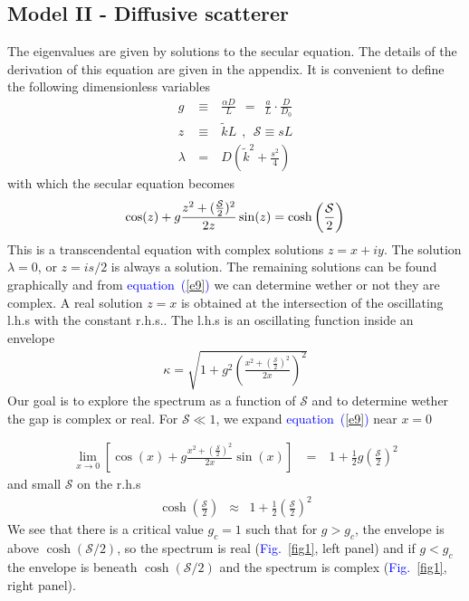\documentclass[aps,pre,floats,floatfix,fleqn,notitlepage]{revtex4-1}
\newcommand{\mylabel}[1]{\label{#1}}  %
\newcommand{\beq}{\begin{eqnarray}}
\newcommand{\eeq}{\end{eqnarray}}
\newcommand{\be}[1]{\begin{eqnarray}\ifthenelse{#1=-1}{\nonumber}{\ifthenelse{#1=0}{}{\mylabel{e#1}}}}
\newcommand{\ee}{\end{eqnarray}}
\newcommand{\Eq}[1]{\textcolor{blue}{equation~(\ref{#1})}} %
\newcommand{\Fig}[1] {\textcolor{blue}{Fig.~\ref{#1}}} %
\begin{document}
\subsection{Model II - Diffusive scatterer}
The eigenvalues are given by solutions to the secular equation.
The details of the derivation of this equation are given in the appendix.  
%
It is convenient to define the following dimensionless variables 
%
\beq
g \ & \equiv & \ \frac{\alpha D}{L} \ \ = \ \ \frac{a}{L}\cdot \frac{D}{D_0} \\
z \ & \equiv & \ \tilde{k}L \ \ , \ \ \mathcal{S} \equiv sL \\
\lambda \ &=& \ D\left( \tilde{k}^2 + \frac{s^2}{4}\right)
\eeq
%
with which the  secular equation becomes
%
\be{9}
\cos(z) +g \frac{z^2+(\frac{\mathcal{S}}{2})^2}{2z}\sin(z) = \cosh\left( \frac{\mathcal{S}}{2}\right)
\ee
%
This is a transcendental equation with complex solutions $z=x+iy$. 
The solution $\lambda=0$, or $z=is/2$ is always a solution.
The remaining solutions can be found graphically and
from \Eq{e9} we can determine wether or not they are complex. 
A real solution $z=x$ is obtained at the intersection
of the oscillating l.h.s with the constant r.h.s..
The l.h.s is an oscillating function inside an envelope
%
\beq
\kappa = \sqrt{1+g^2 \left( \frac{x^2+(\frac{\mathcal{S}}{2})^2}{2x} \right)^2}
\eeq
%
Our goal is to explore the spectrum as a function of $\mathcal{S}$ and to determine 
wether the gap is complex or real.
%
For $\mathcal{S} \ll 1$, we expand \Eq{e9} near $x=0$

%
\beq
\lim_{x\to 0} \left[ \cos(x) + g \frac{x^2+(\frac{\mathcal{S}}{2})^2}{2x}\sin(x)\right] \ &=& \ 1+\frac{1}{2}g\left(\frac{\mathcal{S}}{2}\right)^2
\eeq
%
and small $\mathcal{S}$ on the r.h.s
%
\beq
\cosh\left(\frac{\mathcal{S}}{2}\right) & \approx & 1+\frac{1}{2}\left(\frac{\mathcal{S}}{2}\right)^2
\eeq
%
We see that there is a critical value $g_c=1$
such that for $g > g_c $, the envelope is above $\cosh(\mathcal{S}/2)$, so  the spectrum is real (\Fig{fig1}, left panel) and if  $g<g_c$ the envelope is beneath $\cosh(\mathcal{S}/2)$ and the spectrum is complex (\Fig{fig1}, right panel).
\end{document}

